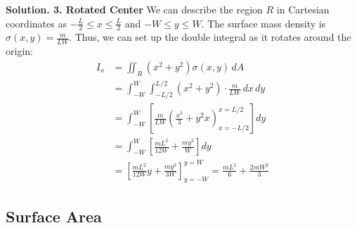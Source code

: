 \documentclass[11pt]{report}
\begin{document}
\begin{example}
    \textbf{Solution. 3. Rotated Center} We can describe the region $R$ in Cartesian coordinates as $-\frac{L}{2} \le x \le \frac{L}{2}$ and $-W \le y \le W$. The surface mass density is $\sigma(x,y) = \frac{m}{LW}$. Thus, we can set up the double integral as it rotates around the origin:
    \begin{equation*}
    \begin{split}
        I_o &= \iint_R (x^2 + y^2) \sigma(x,y) \, dA \\
        &= \int_{-W}^W \int_{-L/2}^{L/2} (x^2 + y^2) \cdot \frac{m}{LW} \, dx \, dy \\
        &= \int_{-W}^W \left[ \frac{m}{LW} \left( \frac{x^3}{3} + y^2 x \right)_{x=-L/2}^{x=L/2} \right] dy \\
        &= \int_{-W}^W \left[ \frac{mL^2}{12W} + \frac{my^2}{W} \right] dy \\
        &= \left[ \frac{mL^2}{12W} y + \frac{my^3}{3W} \right]_{y=-W}^{y=W} = \frac{mL^2}{6} + \frac{2mW^2}{3}
    \end{split}
    \end{equation*}
\end{example}

\subsection{Surface Area}
\end{document}
